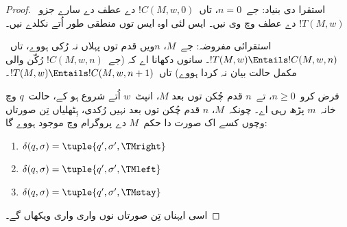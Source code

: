 \documentclass[../../../include/open-logic-section]{subfiles}
\begin{document}
\begin{proof}
استقرا دی بنیاد: جے~$n = 0$، تاں~$!C(M, w, 0)$
دے عطف دے سارے جزو~$!T(M, w)$ دے عطف وچ وی نیں۔ ایس
لئی اوہ ایس توں منطقی طور اُتے نکلدے نیں۔

استقرائی مفروضہ: جے~$M$، $n$ویں قدم توں پہلاں
نہ رُکی ہووے، تاں~$!T(M,w) \Entails !C(M, w, n)$۔
سانوں دکھانا اے کہ (جے~$!C(M, w, n)$ رُکّن والی
مکمل حالت بیان نہ کردا ہووے) تاں~$!T(M, w) \Entails
!C(M, w, n+1)$۔

فرض کرو~$n \ge 0$، تے~$n$ قدم چُکن توں بعد
$M$، انپٹ~$w$ اُتے شروع ہو کے، حالت~$q$ وچ
خانہ~$m$ پڑھ رہی اے۔ چونکہ~$M$، $n$ قدم چُکن
توں بعد نہیں رُکدی، ہِٹھلیاں تِن صورتاں وچوں
کسے اک صورت دا حکم~$M$ دے
پروگرام وچ موجود ہووے گا:

\begin{enumerate} 
\item {} $\delta(q, \sigma) = \tuple{q', \sigma', \TMright}$

\item {} $\delta(q, \sigma) = \tuple{q', \sigma', \TMleft}$

\item {} $\delta(q, \sigma) = \tuple{q', \sigma', \TMstay}$
\end{enumerate}

اسی ایہناں تِن صورتاں نوں واری واری ویکھاں گے۔


\end{proof}
\end{document}
